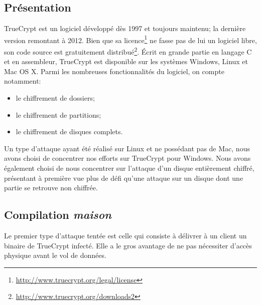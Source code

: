 \documentclass[12pt,a4paper]{article}
\begin{document}
\subsection{Présentation}

TrueCrypt est un logiciel développé dès 1997 et toujours maintenu; la dernière version remontant à 2012. Bien que sa licence\footnote{\url{http://www.truecrypt.org/legal/license}} ne fasse pas de lui un logiciel libre, son code source est gratuitement distribué\footnote{\url{http://www.truecrypt.org/downloads2}}. Écrit en grande partie en langage C et en assembleur, TrueCrypt est disponible sur les systèmes Windows, Linux et Mac OS X. Parmi les nombreuses fonctionnalités du logiciel, on compte notamment:
\begin{itemize}
	\item le chiffrement de dossiers;
	\item le chiffrement de partitions;
	\item le chiffrement de disques complets.
\end{itemize}

Un type d'attaque ayant été réalisé sur Linux et ne possédant pas de Mac, nous avons choisi de concentrer nos efforts sur TrueCrypt pour Windows. Nous avons également choisi de nous concentrer sur l'attaque d'un disque entièrement chiffré, présentant à première vue plus de défi qu'une attaque sur un disque dont une partie se retrouve non chiffrée.

\subsection{Compilation \textit{maison}}

Le premier type d'attaque tentée est celle qui consiste à délivrer à un client un binaire de TrueCrypt infecté. Elle a le gros avantage de ne pas nécessiter d'accès physique avant le vol de données.
\end{document}

